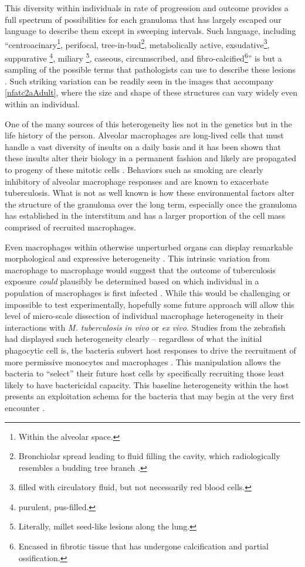 This diversity within individuals in rate of progression and outcome provides a full spectrum of possibilities for each granuloma that has largely escaped our language to describe them except in sweeping intervals. Such language, including ``centroacinary\footnote{Within the alveolar space.}, perifocal, tree\hyp{}in\hyp{}bud\footnote{Bronchiolar spread leading to fluid filling the cavity, which radiologically resembles a budding tree branch \citep{Gosset2009}.}, metabolically active, exsudative\footnote{filled with circulatory fluid, but not necessarily red blood cells.}, suppurative \footnote{purulent, pus\hyp{}filled.}, miliary \footnote{Literally, millet seed\hyp{}like lesions along the lung.}, caseous, circumscribed, and fibro\hyp{}calcified\footnote{Encased in fibrotic tissue that has undergone calcification and partial ossification.}'' is but a sampling of the possible terms that pathologists can use to describe these lesions \citep{Ehlers2012}. Such striking variation can be readily seen in the images that accompany \autoref{nfatc2aAdult}, where the size and shape of these structures can vary widely even within an individual.

One of the many sources of this heterogeneity lies not in the genetics but in the life history of the person. Alveolar macrophages are long\hyp{}lived cells that must handle a vast diversity of insults on a daily basis and it has been shown that these insults alter their biology in a permanent fashion and likely are propagated to progeny of these mitotic cells \citep{Gonzalez2017, Duan2017, Berg2016, Glickman2016, Woodruff2005, Hodge2007}. Behaviors such as smoking are clearly inhibitory of alveolar macrophage responses and are known to exacerbate tuberculosis. What is not as well known is how these environmental factors alter the structure of the granuloma over the long term, especially once the granuloma has established in the interstitum and has a larger proportion of the cell mass comprised of recruited macrophages.

Even macrophages within otherwise unperturbed organs can display remarkable morphological and expressive heterogeneity \citep{Gordon2017, Gordon2005a}. This intrinsic variation from macrophage to macrophage would suggest that the outcome of tuberculosis exposure \textit{could} plausibly be determined based on which individual in a population of macrophages is first infected \citep{Verrall2014}. While this would be challenging or impossible to test experimentally, hopefully some future approach will allow this level of micro\hyp{}scale dissection of individual macrophage heterogeneity in their interactions with \textit{M. tuberculosis} \textit{in vivo} or \textit{ex vivo}. Studies from the zebrafish had displayed such heterogeneity clearly -- regardless of what the initial phagocytic cell is, the bacteria subvert host responses to drive the recruitment of more permissive monocytes and macrophages \citep{Cambier2014b}. This manipulation allows the bacteria to ``select'' their future host cells by specifically recruiting those least likely to have bactericidal capacity. This baseline heterogeneity within the host presents an exploitation schema for the bacteria that may begin at the very first encounter \citep{Ramakrishnan2013b}.

